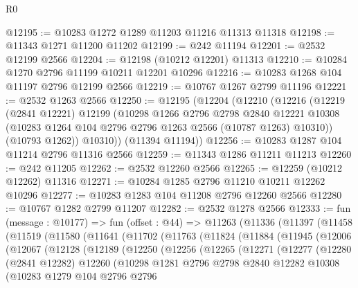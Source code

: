 \begin{lexlean}{R0}
\begin{coremodule}
@12195 := @10283 @1272 @1289 @11203 @11216 @11313 @11318
@12198 := @11343 @1271 @11200 @11202
@12199 := @242 @11194
@12201 := @2532 @12199 @2566
@12204 := @12198 (@10212 @12201) @11313
@12210 := @10284 @1270 @2796 @11199 @10211 @12201 @10296
@12216 := @10283 @1268 @104 @11197 @2796 @12199 @2566
@12219 := @10767 @1267 @2799 @11196
@12221 := @2532 @1263 @2566
@12250 := @12195
    (@12204
      (@12210
        (@12216
          (@12219
            (@2841 @12221)
            @12199
            (@10298
              @1266
              @2796
              @2798
              @2840
              @12221
              @10308
              (@10283 @1264 @104 @2796 @2796 @1263 @2566 (@10787 @1263) @10310))
            (@10793 @1262))
          @10310))
      (@11394 @11194))
@12256 := @10283 @1287 @104 @11214 @2796 @11316 @2566
@12259 := @11343 @1286 @11211 @11213
@12260 := @242 @11205
@12262 := @2532 @12260 @2566
@12265 := @12259 (@10212 @12262) @11316
@12271 := @10284 @1285 @2796 @11210 @10211 @12262 @10296
@12277 := @10283 @1283 @104 @11208 @2796 @12260 @2566
@12280 := @10767 @1282 @2799 @11207
@12282 := @2532 @1278 @2566
@12333 := fun (message : @10177) =>
  fun (offset : @44) =>
  @11263
    (@11336
      (@11397
        (@11458
          (@11519
            (@11580
              (@11641
                (@11702
                  (@11763
                    (@11824
                      (@11884
                        (@11945
                          (@12006
                            (@12067
                              (@12128
                                (@12189
                                  (@12250
                                    (@12256
                                      (@12265
                                        (@12271
                                          (@12277
                                            (@12280
                                              (@2841 @12282)
                                              @12260
                                              (@10298
                                                @1281
                                                @2796
                                                @2798
                                                @2840
                                                @12282
                                                @10308
                                                (@10283
                                                  @1279
                                                  @104
                                                  @2796
                                                  @2796

\end{coremodule}
\end{lexlean}
